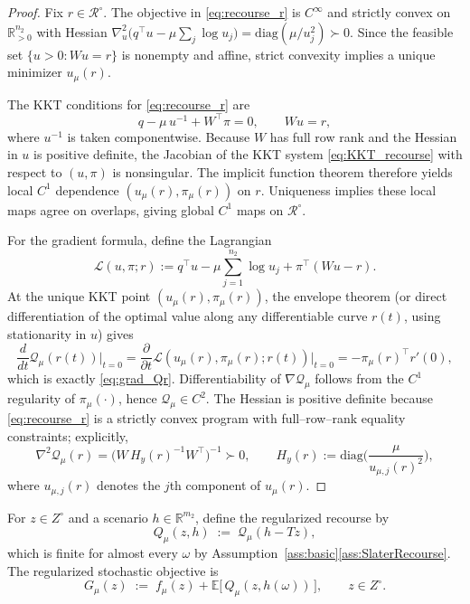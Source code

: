 \documentclass[11pt]{article}
\newcommand{\R}{\mathbb{R}}
\newcommand{\E}{\mathbb{E}}
\theoremstyle{plain}
\theoremstyle{definition}
\begin{document}
\begin{proof}
Fix $r\in\mathcal{R}^\circ$. The objective in \eqref{eq:recourse_r} is $C^\infty$ and strictly convex on
$\R^{n_2}_{>0}$ with Hessian $\nabla^2_u\big(q^\top u-\mu\sum_j\log u_j\big)=\mathrm{diag}(\mu/u_j^2)\succ 0$.
Since the feasible set $\{u>0:Wu=r\}$ is nonempty and affine, strict convexity implies a unique minimizer
$u_\mu(r)$.

The KKT conditions for \eqref{eq:recourse_r} are
\begin{equation}\label{eq:KKT_recourse}
q - \mu\,u^{-1} + W^\top \pi = 0,
\qquad
Wu=r,
\end{equation}
where $u^{-1}$ is taken componentwise. Because $W$ has full row rank and the Hessian in $u$ is positive definite,
the Jacobian of the KKT system \eqref{eq:KKT_recourse} with respect to $(u,\pi)$ is nonsingular.
The implicit function theorem therefore yields local $C^1$ dependence $(u_\mu(r),\pi_\mu(r))$ on $r$.
Uniqueness implies these local maps agree on overlaps, giving global $C^1$ maps on $\mathcal{R}^\circ$.

For the gradient formula, define the Lagrangian
\[
\mathcal{L}(u,\pi;r):= q^\top u - \mu\sum_{j=1}^{n_2}\log u_j + \pi^\top(Wu-r).
\]
At the unique KKT point $(u_\mu(r),\pi_\mu(r))$, the envelope theorem (or direct differentiation of the optimal
value along any differentiable curve $r(t)$, using stationarity in $u$) gives
\[
\frac{d}{dt}\mathcal{Q}_\mu(r(t))\Big|_{t=0}
=
\frac{\partial}{\partial t}\mathcal{L}(u_\mu(r),\pi_\mu(r);r(t))\Big|_{t=0}
=
-\pi_\mu(r)^\top r'(0),
\]
which is exactly \eqref{eq:grad_Qr}. Differentiability of $\nabla \mathcal{Q}_\mu$ follows from the $C^1$
regularity of $\pi_\mu(\cdot)$, hence $\mathcal{Q}_\mu\in C^2$. The Hessian is positive definite because
\eqref{eq:recourse_r} is a strictly convex program with full--row--rank equality constraints; explicitly,
\[
\nabla^2 \mathcal{Q}_\mu(r) = \big(W\,H_y(r)^{-1}W^\top\big)^{-1}\succ 0,\qquad
H_y(r):=\mathrm{diag}\!\Big(\frac{\mu}{u_{\mu,j}(r)^2}\Big),
\]
where $u_{\mu,j}(r)$ denotes the $j$th component of $u_\mu(r)$.
\end{proof}

For $z\in Z^\circ$ and a scenario $h\in\R^{m_2}$, define the regularized recourse by
\[
Q_\mu(z,h)\;:=\;\mathcal{Q}_\mu(h-Tz),
\]
which is finite for almost every $\omega$ by Assumption~\ref{ass:basic}\ref{ass:SlaterRecourse}.
The regularized stochastic objective is
\begin{equation}\label{eq:Gmu}
G_\mu(z) \;:=\; f_\mu(z) + \E\big[\,Q_\mu(z,h(\omega))\,\big],\qquad z\in Z^\circ.
\end{equation}
\end{document}
